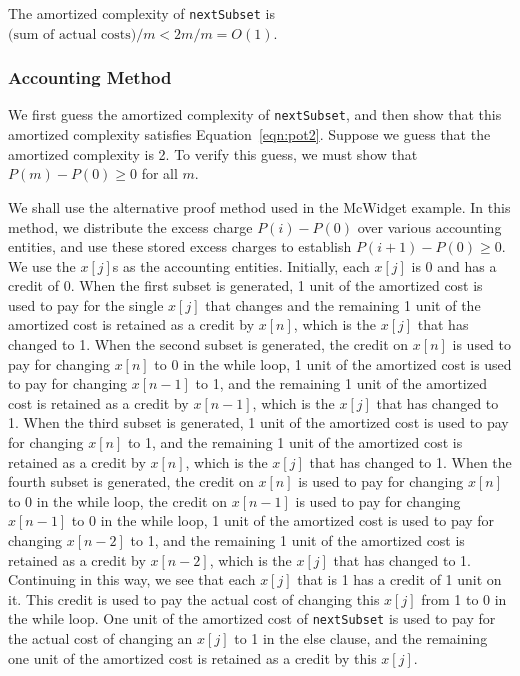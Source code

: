 The amortized complexity of {\tt nextSubset}
is $\mbox{(sum of actual costs)}/m < 2m/m = O(1)$.

\subsubsection*{Accounting Method}
We first guess the amortized complexity of {\tt nextSubset},
and then show that this amortized complexity satisfies Equation~\ref{eqn:pot2}.
Suppose we guess that the amortized complexity is 2.
To verify this guess, we must show that
$P(m) - P(0) \geq 0$
for all $m$.

We shall use the alternative proof method used in the McWidget example.
In this method, we
distribute the excess charge
$P(i) - P(0)$ over various accounting entities,
and use these stored excess charges
to establish
$P(i+1) - P(0) \geq 0$.
We use the $x[j]$s as the accounting entities.
Initially, each $x[j]$ is 0 and
has
a credit of 0.
When the first subset is generated,
1 unit of the amortized cost is used to pay
for the single $x[j]$ that changes and the remaining
1 unit of
the amortized cost is retained as a credit
by $x[n]$, which is the $x[j]$
that has changed to 1.
When the second subset is generated, the credit on
$x[n]$ is used to pay for changing
$x[n]$ to 0 in the
while loop,
1 unit of the amortized cost is used to pay
for changing $x[n-1]$ to
1, and the remaining
1 unit of
the amortized cost is retained as a credit
by $x[n-1]$, which is the $x[j]$
that has changed to 1.
When the third subset is generated,
1 unit of the amortized cost is used to pay
for changing $x[n]$ to
1, and the remaining
1 unit of
the amortized cost is retained as a credit
by $x[n]$, which is the $x[j]$
that has changed to 1.
When the fourth subset is generated,
the credit on
$x[n]$ is used to pay for changing
$x[n]$ to 0 in the
while loop,
the credit on
$x[n-1]$ is used to pay for changing
$x[n-1]$ to 0 in the
while loop,
1 unit of the amortized cost is used to pay
for changing $x[n-2]$ to
1, and the remaining
1 unit of
the amortized cost is retained as a credit
by $x[n-2]$, which is the $x[j]$
that has changed to 1.
Continuing in this way, we see that each
$x[j]$ that is 1 has a credit
of 1 unit on it. This credit is used to pay
the actual cost of changing this $x[j]$
from 1 to
0 in the while
loop. One unit of the amortized cost of {\tt nextSubset}
is used to pay for the actual cost of changing an
$x[j]$ to 1 in the
else clause, and the remaining
one unit of the amortized cost is retained as a credit by this
$x[j]$.

